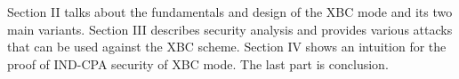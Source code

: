 \documentclass[conference]{IEEEtran}
\begin{document}
Section II talks about the fundamentals and design of the XBC mode and its two main variants. Section III describes security analysis and provides various attacks that can be used against the XBC scheme. Section IV shows an intuition for the proof of IND-CPA security of XBC mode. The last part is conclusion.

%
%



%
%
\end{document}
